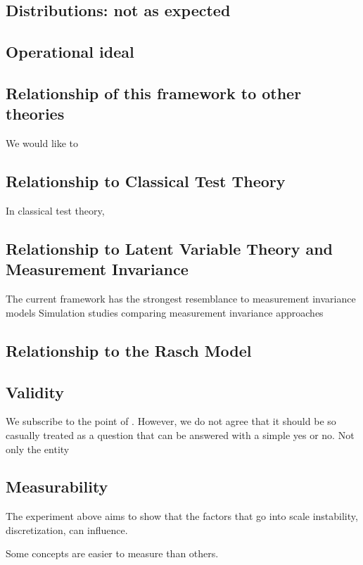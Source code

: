 \documentclass[utf8]{FrontiersinVancouver}
\begin{document}
\subsection{Distributions: not as expected}

\subsection{Operational ideal}

\subsection{Relationship of this framework to other theories}
We would like to 
\subsection{Relationship to Classical Test Theory}
In classical test theory, 

\subsection{Relationship to Latent Variable Theory and Measurement Invariance}
The current framework has the strongest resemblance to measurement invariance models 
Simulation studies comparing measurement invariance approaches 

\subsection{Relationship to the Rasch Model}

\subsection{Validity}
We subscribe to the point of . However, we do not agree that it should be so casually treated as a question that can be answered with a simple yes or no. Not only the entity 

\subsection{Measurability}
The experiment above aims to show that the factors that go into scale instability, discretization, can influence. 

Some concepts are easier to measure than others. 
\end{document}
